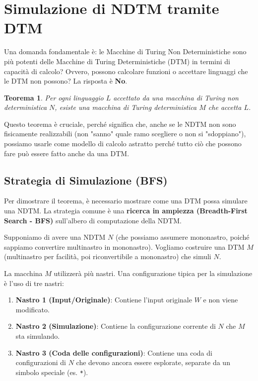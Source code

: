 \documentclass[a4paper, 11pt]{book} %
\newtheorem{theorem}{Teorema}[section]
\theoremstyle{definition}
\begin{document}
\section{Simulazione di NDTM tramite DTM}

Una domanda fondamentale è: le Macchine di Turing Non Deterministiche sono più potenti delle Macchine di Turing Deterministiche (DTM) in termini di capacità di calcolo? Ovvero, possono calcolare funzioni o accettare linguaggi che le DTM non possono? La risposta è \textbf{No}.

\begin{theorem}
Per ogni linguaggio $L$ accettato da una macchina di Turing non deterministica $N$, esiste una macchina di Turing deterministica $M$ che accetta $L$.
\end{theorem}
Questo teorema è cruciale, perché significa che, anche se le NDTM non sono fisicamente realizzabili (non "sanno" quale ramo scegliere o non si "sdoppiano"), possiamo usarle come modello di calcolo astratto perché tutto ciò che possono fare può essere fatto anche da una DTM.

\subsection{Strategia di Simulazione (BFS)}
Per dimostrare il teorema, è necessario mostrare come una DTM possa simulare una NDTM. La strategia comune è una \textbf{ricerca in ampiezza (Breadth-First Search - BFS)} sull'albero di computazione della NDTM.

Supponiamo di avere una NDTM $N$ (che possiamo assumere mononastro, poiché sappiamo convertire multinastro in mononastro). Vogliamo costruire una DTM $M$ (multinastro per facilità, poi riconvertibile a mononastro) che simuli $N$.


La macchina $M$ utilizzerà più nastri. Una configurazione tipica per la simulazione è l'uso di tre nastri:
\begin{enumerate}
    \item \textbf{Nastro 1 (Input/Originale)}: Contiene l'input originale $W$ e non viene modificato.
    \item \textbf{Nastro 2 (Simulazione)}: Contiene la configurazione corrente di $N$ che $M$ sta simulando.
    \item \textbf{Nastro 3 (Coda delle configurazioni)}: Contiene una coda di configurazioni di $N$ che devono ancora essere esplorate, separate da un simbolo speciale (es. \texttt{*}).
\end{enumerate}
\end{document}
